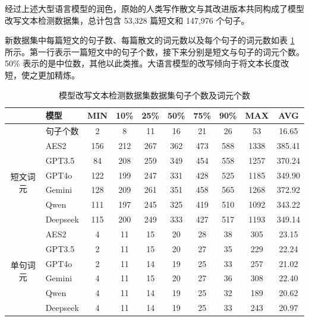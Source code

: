 经过上述大型语言模型的润色，原始的人类写作散文与其改进版本共同构成了模型改写文本检测数据集，总计包含 53,328 篇短文和 147,976 个句子。

新数据集中每篇短文的句子数、每篇散文的词元数以及每个句子的词元数如表 \ref{tab:TOSWT-length} 所示。第一行表示一篇短文中的句子个数，接下来分别是短文与句子的词元个数。50\% 表示的是中位数，其他以此类推。大语言模型的改写倾向于将文本长度改短，使之更加精炼。

\begin{table}[htbp]
\centering

\caption{模型改写文本检测数据集数据集句子个数及词元个数}
\begin{tabular}{c|l|cccccccc}
\toprule
                          & \textbf{模型}  & \textbf{MIN} & \textbf{10\%} & \textbf{25\%} & \textbf{50\%} & \textbf{75\%} & \textbf{90\%} & \textbf{MAX}  & \textbf{AVG}   \\
    \midrule
                          & 句子个数        & 2   & 8    & 11   & 16   & 21   & 26   & 53   & 16.65  \\ \midrule
\multirow{6}{*}{短文词元} & AES2            & 156 & 212  & 267  & 362  & 473  & 588  & 1338 & 385.41 \\
                          & GPT3.5          & 84  & 208  & 259  & 349  & 454  & 558  & 1257 & 370.24 \\
                          & GPT4o           & 122 & 199  & 247  & 331  & 428  & 525  & 1185 & 349.90 \\
                          & Gemini          & 128 & 209  & 261  & 351  & 458  & 565  & 1268 & 372.92 \\
                          & Qwen            & 111 & 197  & 245  & 325  & 419  & 510  & 1092 & 343.22 \\
                          & Deepseek        & 115 & 200  & 249  & 333  & 427  & 517  & 1193 & 349.14 \\
                          \midrule
\multirow{6}{*}{单句词元} & AES2            & 4   & 11   & 15   & 20   & 28   & 38   & 305  & 23.15  \\
                          & GPT3.5          & 2   & 11   & 15   & 20   & 27   & 35   & 229  & 22.24  \\
                          & GPT4o           & 2   & 11   & 14   & 19   & 25   & 33   & 257  & 21.02  \\
                          & Gemini          & 4   & 11   & 15   & 20   & 27   & 36   & 308  & 22.40  \\
                          & Qwen            & 4   & 11   & 14   & 19   & 25   & 32   & 189  & 20.62  \\
                          & Deepseek        & 4   & 11   & 14   & 19   & 25   & 33   & 243  & 20.97 \\
                          \bottomrule
\end{tabular}

\label{tab:TOSWT-length}

\end{table}

